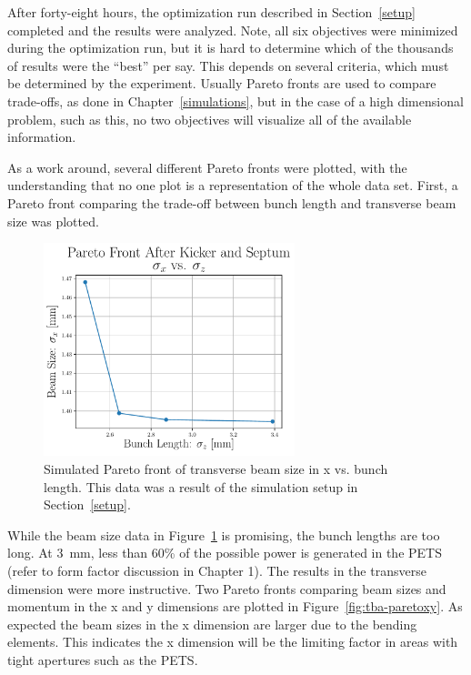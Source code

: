 After forty-eight hours, the optimization run described in Section~\ref{setup} completed and the results were analyzed. 
Note, all six objectives were minimized during the optimization run, but it is hard to determine which 
of the thousands of results were the ``best'' per say. This depends on several criteria, which must be 
determined by the experiment. Usually Pareto fronts are used to compare trade-offs,
as done in Chapter~\ref{simulations}, but in the case of a high dimensional problem, such as this, 
no two objectives will visualize all of the available information.

As a work around, several different Pareto fronts were plotted, with the understanding that 
no one plot is a representation of the whole data set.
First, a Pareto front comparing the trade-off between bunch length and transverse beam size was plotted.  
\begin{figure}
	\centering
	\includegraphics[width=0.65\textwidth]{images/x_vs_z_pareto_front_Q5}
	\caption{Simulated Pareto front of transverse beam size in x vs. bunch length.
		This data was a result of the simulation setup in Section~\ref{setup}.}
	\label{fig:xz-pareto}
\end{figure}
While the beam size data in Figure~\ref{fig:xz-pareto} is promising, the bunch lengths are too long.
At \SI{3}{mm}, less than 60\% of the possible power is generated in the PETS (refer to form factor discussion in Chapter 1). 
The results in the transverse dimension were
more instructive. Two Pareto fronts comparing beam sizes
and momentum in the x and y dimensions are plotted in Figure~\ref{fig:tba-paretoxy}.
As expected the beam sizes in the x dimension are larger 
due to the bending elements. This indicates the x dimension will be the 
limiting factor in areas with tight apertures such as the PETS.  
